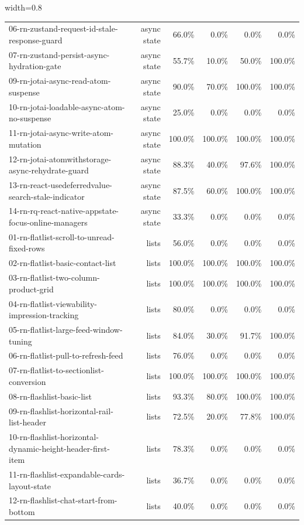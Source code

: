 \begin{table}[htbp]
\begin{adjustbox}{width=0.8\textwidth}
\begin{tabular}{lrrrrr}
06-rn-zustand-request-id-stale-response-guard & async state & 66.0\% & 0.0\% & 0.0\% & 0.0\% \\
07-rn-zustand-persist-async-hydration-gate & async state & 55.7\% & 10.0\% & 50.0\% & 100.0\% \\
09-rn-jotai-async-read-atom-suspense & async state & 90.0\% & 70.0\% & 100.0\% & 100.0\% \\
10-rn-jotai-loadable-async-atom-no-suspense & async state & 25.0\% & 0.0\% & 0.0\% & 0.0\% \\
11-rn-jotai-async-write-atom-mutation & async state & 100.0\% & 100.0\% & 100.0\% & 100.0\% \\
12-rn-jotai-atomwithstorage-async-rehydrate-guard & async state & 88.3\% & 40.0\% & 97.6\% & 100.0\% \\
13-rn-react-usedeferredvalue-search-stale-indicator & async state & 87.5\% & 60.0\% & 100.0\% & 100.0\% \\
14-rn-rq-react-native-appstate-focus-online-managers & async state & 33.3\% & 0.0\% & 0.0\% & 0.0\% \\
01-rn-flatlist-scroll-to-unread-fixed-rows & lists & 56.0\% & 0.0\% & 0.0\% & 0.0\% \\
02-rn-flatlist-basic-contact-list & lists & 100.0\% & 100.0\% & 100.0\% & 100.0\% \\
03-rn-flatlist-two-column-product-grid & lists & 100.0\% & 100.0\% & 100.0\% & 100.0\% \\
04-rn-flatlist-viewability-impression-tracking & lists & 80.0\% & 0.0\% & 0.0\% & 0.0\% \\
05-rn-flatlist-large-feed-window-tuning & lists & 84.0\% & 30.0\% & 91.7\% & 100.0\% \\
06-rn-flatlist-pull-to-refresh-feed & lists & 76.0\% & 0.0\% & 0.0\% & 0.0\% \\
07-rn-flatlist-to-sectionlist-conversion & lists & 100.0\% & 100.0\% & 100.0\% & 100.0\% \\
08-rn-flashlist-basic-list & lists & 93.3\% & 80.0\% & 100.0\% & 100.0\% \\
09-rn-flashlist-horizontal-rail-list-header & lists & 72.5\% & 20.0\% & 77.8\% & 100.0\% \\
10-rn-flashlist-horizontal-dynamic-height-header-first-item & lists & 78.3\% & 0.0\% & 0.0\% & 0.0\% \\
11-rn-flashlist-expandable-cards-layout-state & lists & 36.7\% & 0.0\% & 0.0\% & 0.0\% \\
12-rn-flashlist-chat-start-from-bottom & lists & 40.0\% & 0.0\% & 0.0\% & 0.0\% \\

\end{tabular}
\end{adjustbox}
\end{table}
